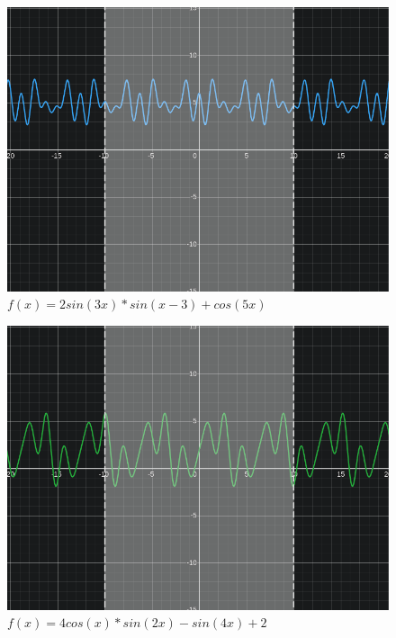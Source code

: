 \documentclass{article}
\begin{document}
\begin{figure}[H]
    \centering
    \includegraphics[width=\textwidth]{"../assets/f_2.png"}
    \caption{$f(x) = 2sin(3x) * sin(x-3) + cos(5x)$}
    \label{fig:f_2}
\end{figure}
\begin{figure}[H]
    \centering
    \includegraphics[width=\textwidth]{"../assets/f_3.png"}
    \caption{$f(x) = 4cos(x) * sin(2x) - sin(4x) + 2$}
    \label{fig:f_3}
\end{figure}
\end{document}
